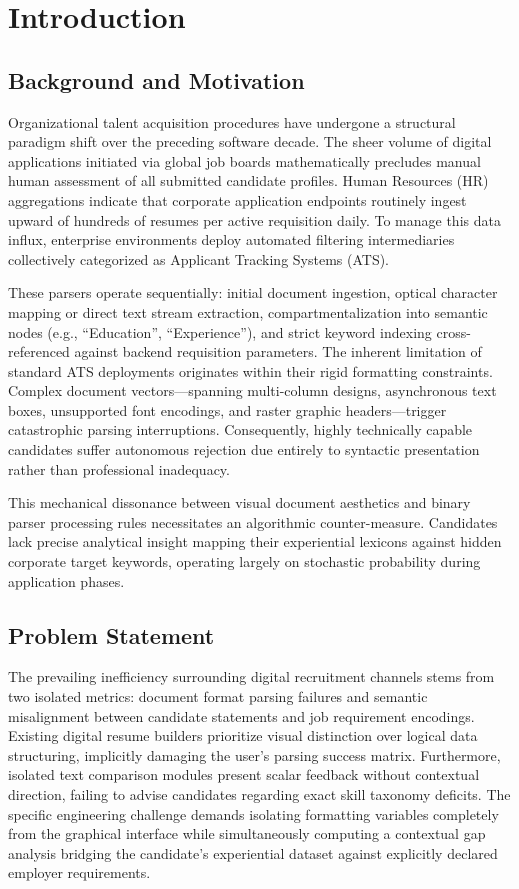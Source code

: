 \documentclass[12pt,a4paper]{report}
\begin{document}
\chapter{Introduction}

\section{Background and Motivation}
Organizational talent acquisition procedures have undergone a structural paradigm shift over the preceding software decade. The sheer volume of digital applications initiated via global job boards mathematically precludes manual human assessment of all submitted candidate profiles. Human Resources (HR) aggregations indicate that corporate application endpoints routinely ingest upward of hundreds of resumes per active requisition daily. To manage this data influx, enterprise environments deploy automated filtering intermediaries collectively categorized as Applicant Tracking Systems (ATS).

These parsers operate sequentially: initial document ingestion, optical character mapping or direct text stream extraction, compartmentalization into semantic nodes (e.g., ``Education'', ``Experience''), and strict keyword indexing cross-referenced against backend requisition parameters. The inherent limitation of standard ATS deployments originates within their rigid formatting constraints. Complex document vectors—spanning multi-column designs, asynchronous text boxes, unsupported font encodings, and raster graphic headers—trigger catastrophic parsing interruptions. Consequently, highly technically capable candidates suffer autonomous rejection due entirely to syntactic presentation rather than professional inadequacy. 

This mechanical dissonance between visual document aesthetics and binary parser processing rules necessitates an algorithmic counter-measure. Candidates lack precise analytical insight mapping their experiential lexicons against hidden corporate target keywords, operating largely on stochastic probability during application phases.

\section{Problem Statement}
The prevailing inefficiency surrounding digital recruitment channels stems from two isolated metrics: document format parsing failures and semantic misalignment between candidate statements and job requirement encodings. Existing digital resume builders prioritize visual distinction over logical data structuring, implicitly damaging the user’s parsing success matrix. Furthermore, isolated text comparison modules present scalar feedback without contextual direction, failing to advise candidates regarding exact skill taxonomy deficits. The specific engineering challenge demands isolating formatting variables completely from the graphical interface while simultaneously computing a contextual gap analysis bridging the candidate's experiential dataset against explicitly declared employer requirements.
\end{document}

